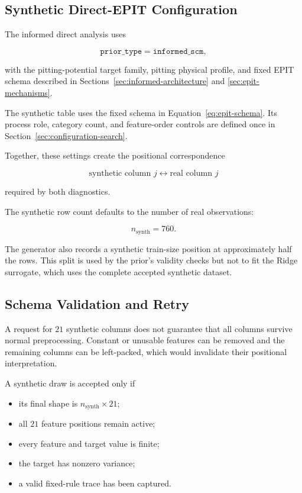 \documentclass{article}
\begin{document}
\subsection{Synthetic Direct-EPIT Configuration}

The informed direct analysis uses

\[
\texttt{prior\_type}
=
\texttt{informed\_scm},
\]

with the pitting-potential target family, pitting physical profile, and fixed EPIT schema described in Sections~\ref{sec:informed-architecture} and \ref{sec:epit-mechanisms}.

The synthetic table uses the fixed schema in Equation~\eqref{eq:epit-schema}. Its process role, category count, and feature-order controls are defined once in Section~\ref{sec:configuration-search}.

Together, these settings create the positional correspondence

\[
\text{synthetic column }j
\longleftrightarrow
\text{real column }j
\]

required by both diagnostics.

The synthetic row count defaults to the number of real observations:

\[
n_{\mathrm{synth}}=760.
\]

The generator also records a synthetic train-size position at approximately half the rows. This split is used by the prior's validity checks but not to fit the Ridge surrogate, which uses the complete accepted synthetic dataset.

\subsection{Schema Validation and Retry}

A request for \(21\) synthetic columns does not guarantee that all columns survive normal preprocessing. Constant or unusable features can be removed and the remaining columns can be left-packed, which would invalidate their positional interpretation.

A synthetic draw is accepted only if

\begin{itemize}
    \item its final shape is \(n_{\mathrm{synth}}\times21\);
    \item all \(21\) feature positions remain active;
    \item every feature and target value is finite;
    \item the target has nonzero variance;
    \item a valid fixed-rule trace has been captured.
\end{itemize}
\end{document}
